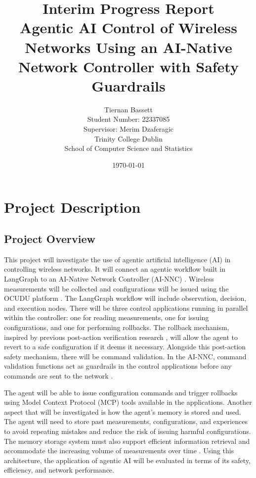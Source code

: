 \documentclass[12pt,a4paper]{article}
\title{
    Interim Progress Report\\[0.5cm]
    \large Agentic AI Control of Wireless Networks
    Using an AI-Native Network Controller
    with Safety Guardrails
}
\author{
    Tiernan Bassett\\
    Student Number: 22337085\\
    Supervisor: Merim Dzaferagic\\
    Trinity College Dublin\\
    School of Computer Science and Statistics
}
\date{\today}
\begin{document}
\maketitle
\thispagestyle{empty}

\newpage

\tableofcontents

\newpage

\section{Project Description}

\subsection{Project Overview}
This project will investigate the use of agentic artificial intelligence (AI) in controlling wireless networks. It will connect an agentic workflow built in LangGraph \cite{langgraph} to an AI-Native Network Controller (AI-NNC) \cite{dzaferagic2026ai}. Wireless measurements will be collected and configurations will be issued using the OCUDU platform \cite{ocudu}. The LangGraph workflow will include observation, decision, and execution nodes. There will be three control applications running in parallel within the controller: one for reading measurements, one for issuing configurations, and one for performing rollbacks. The rollback mechanism, inspired by previous post-action verification research \cite{tsvetkov2015post}, will allow the agent to revert to a safe configuration if it deems it necessary. Alongside this post-action safety mechanism, there will be command validation. In the AI-NNC, command validation functions act as guardrails in the control applications before any commands are sent to the network \cite{dzaferagic2026ai}. 

The agent will be able to issue configuration commands and trigger rollbacks using Model Context Protocol (MCP) tools \cite{mcp} available in the applications. Another aspect that will be investigated is how the agent's memory is stored and used. The agent will need to store past measurements, configurations, and experiences to avoid repeating mistakes and reduce the risk of issuing harmful configurations. The memory storage system must also support efficient information retrieval and accommodate the increasing volume of measurements over time \cite{gao2025efficient}. Using this architecture, the application of agentic AI will be evaluated in terms of its safety, efficiency, and network performance.
\end{document}
